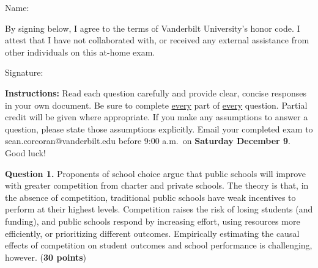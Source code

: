 \documentclass[12pt]{article}
\begin{document}
\setlength{\parindent}{0pt}

\begin{center}
\end{center}

\vspace{1.0in}

\begin{center}
\parbox{4.5in}{
	Name:\enspace\hrulefill
	
	\vspace{0.5in}
	
	By signing below, I agree to the terms of Vanderbilt University's honor code. I attest that I have not collaborated with, or received any external assistance from other individuals on this at-home exam.
	
	\vspace{.5in}
	
	Signature:\enspace\hrulefill
}
\end{center}

\vspace{0.75in}

\textbf{Instructions:} Read each question carefully and provide clear, concise responses in your own document. Be sure to complete \underline{every} part of \underline{every} question. Partial credit will be given where appropriate. If you make any assumptions to answer a question, please state those assumptions explicitly. Email your completed exam to sean.corcoran@vanderbilt.edu before 9:00 a.m.\ on \textbf{Saturday December 9}. Good luck!

\pagebreak



\textbf{Question 1.} Proponents of school choice argue that public schools will improve with greater competition from charter and private schools. The theory is that, in the absence of competition, traditional public schools have weak incentives to perform at their highest levels. Competition raises the risk of losing students (and funding), and public schools respond by increasing effort, using resources more efficiently, or prioritizing different outcomes. Empirically estimating the causal effects of competition on student outcomes and school performance is challenging, however. ({\bf 30 points})
\bigskip
\end{document}
